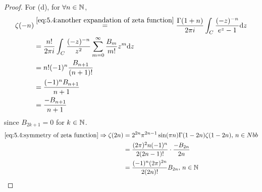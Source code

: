\begin{proof}
    For (d), for  $ \forall n\in \mathbb N $,
    \begin{equation}
        \begin{aligned}
            \zeta(-n)&\overset{\eqref{eq:5.4:another expandation of zeta function}}{=}\frac{\Gamma(1+n)}{2\pi i}\int_C\frac{(-z)^{-n}}{e^z-1}\mathrm{d} z\\
            &=\frac{n!}{2\pi i}\int_C\frac{(-z)^{-n}}{z^2}\sum_{m=0}^\infty\frac{B_m}{m!}z^m\mathrm{d} z\\
            &=n!(-1)^n\frac{B_{n+1}}{(n+1)!}\\
            &=\frac{(-1)^nB_{n+1}}{n+1}\\
            &=\frac{-B_{n+1}}{n+1}
        \end{aligned}
    \end{equation} 
    since  $ B_{2k+1}=0 $ for  $ k\in \mathbb N $. 
    \begin{equation}
        \begin{aligned}
            \eqref{eq:5.4:symmetry of zeta function}\Rightarrow\zeta(2n)&=2^{2n}\pi^{2n-1}\sin(\pi n)\Gamma(1-2n)\zeta(1-2n),\,n\in Nbb\\
            &=\frac{(2\pi)^2n(-1)^n}{2(2n-1)!}\cdot\frac{-B_{2n}}{2n}\\
            &=\frac{(-1)^n(2\pi)^{2n}}{2(2n)!}B_{2n},\,n\in \mathbb N
        \end{aligned}
    \end{equation}
\end{proof}